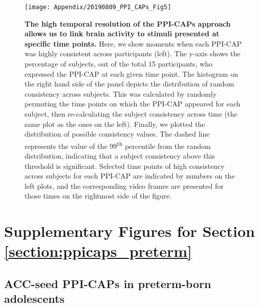 \begin{figure}[h]
\centering
\texttt{[image: Appendix/20190809\_PPI\_CAPs\_Fig5]}
\caption{\textbf{The high temporal resolution of the PPI-CAPs approach allows us to link brain activity to stimuli presented at specific time points.} Here, we show moments when each PPI-CAP was highly consistent across participants (left). The y-axis shows the percentage of subjects, out of the total 15 participants, who expressed the PPI-CAP at each given time point.  The histogram on the right hand side of the panel depicts the distribution of random consistency across subjects. This was calculated by randomly permuting the time points on which the PPI-CAP appeared for each subject, then re-calculating the subject consistency across time (the same plot as the ones on the left). Finally, we plotted the distribution of possible consistency values. The dashed line represents the value of the 99\textsuperscript{th} percentile from the random distribution, indicating that a subject consistency above this threshold is significant. Selected time points of high consistency across subjects for each PPI-CAP are indicated by numbers on the left plots, and the corresponding video frames are presented for those times on the rightmost side of the figure.   }
\label{fig:PPI_CAPs_Fig5}
\end{figure}


\clearpage
\section{Supplementary Figures for Section \ref{section:ppicaps_preterm}}

\subsection{ACC-seed PPI-CAPs in preterm-born adolescents}


